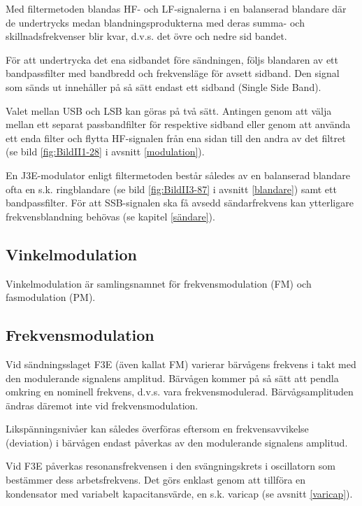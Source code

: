 
Med filtermetoden blandas HF- och LF-signalerna i en balanserad
blandare där de undertrycks medan blandningsprodukterna med deras
summa- och skillnadsfrekvenser blir kvar, d.v.s. det övre och nedre
sid bandet.

För att undertrycka det ena sidbandet före sändningen, följs blandaren
av ett bandpassfilter med bandbredd och frekvensläge för avsett
sidband. Den signal som sänds ut innehåller på så sätt endast ett
sidband (Single Side Band).

Valet mellan USB och LSB kan göras på två sätt. Antingen genom att
välja mellan ett separat passbandfilter för respektive sidband eller
genom att använda ett enda filter och flytta HF-signalen från ena
sidan till den andra av det filtret (se bild \ref{fig:BildII1-28} i
avsnitt \ref{modulation}).

En J3E-modulator enligt filtermetoden består således av en balanserad
blandare ofta en s.k. ringblandare (se bild \ref{fig:BildII3-87} i avsnitt
\ref{blandare}) samt ett bandpassfilter.  För att SSB-signalen ska få avsedd
sändarfrekvens kan ytterligare frekvensblandning behövas (se kapitel
\ref{sändare}).

\subsection{Vinkelmodulation}

Vinkelmodulation är samlingsnamnet för frekvensmodulation (FM) och
fasmodulation (PM).

\subsection{Frekvensmodulation}

Vid sändningsslaget F3E (även kallat FM) varierar bärvågens frekvens i
takt med den modulerande signalens amplitud. Bärvågen kommer på så
sätt att pendla omkring en nominell frekvens, d.v.s. vara
frekvensmodulerad. Bärvågsamplituden ändras däremot inte vid
frekvensmodulation.

Likspänningsnivåer kan således överföras eftersom en frekvensavvikelse
(deviation) i bärvågen endast påverkas av den modulerande signalens
amplitud.

Vid F3E påverkas resonansfrekvensen i den svängningskrets i
oscillatorn som bestämmer dess arbetsfrekvens. Det görs enklast genom
att tillföra en kondensator med variabelt kapacitansvärde, en
s.k. varicap (se avsnitt \ref{varicap}).

